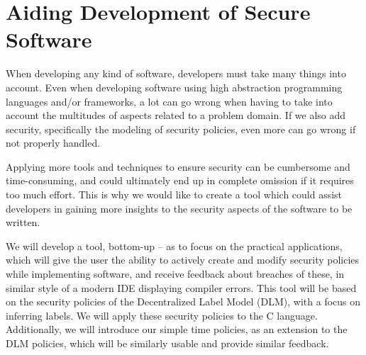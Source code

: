
\section{Aiding Development of Secure Software}
When developing any kind of software, developers must take many things into account.
Even when developing software using high abstraction programming languages and/or frameworks, a lot can go wrong when having to take into account the multitudes of aspects related to a problem domain.
If we also add security, specifically the modeling of security policies, even more can go wrong if not properly handled.

Applying more tools and techniques to ensure security can be cumbersome and time-consuming, and could ultimately end up in complete omission if it requires too much effort.
This is why we would like to create a tool which could assist developers in gaining more insights to the security aspects of the software to be written.


We will develop a tool, bottom-up -- as to focus on the practical applications, which will give the user the ability to actively create and modify security policies while implementing software, and receive feedback about breaches of these, in similar style of a modern IDE displaying compiler errors.
This tool will be based on the security policies of the Decentralized Label Model (DLM), with a focus on inferring labels.
We will apply these security policies to the C language.
Additionally, we will introduce our simple time policies, as an extension to the DLM policies, which will be similarly usable and provide similar feedback.


